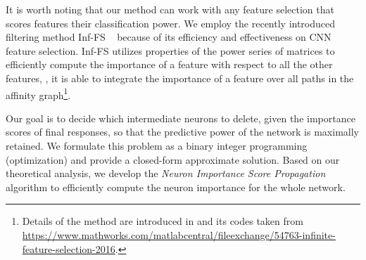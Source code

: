 \documentclass[10pt,twocolumn,letterpaper]{article}
\begin{document}
It is worth noting that our method can work with any feature selection that scores features \wrt their classification power. We employ the recently introduced filtering method Inf-FS ~\cite{Roffo_2015_ICCV} because of its efficiency and effectiveness on CNN feature selection. 
Inf-FS utilizes properties of the power series of matrices to efficiently compute the  importance of a feature with respect to all the other features, \ie, it is able to integrate the importance of a feature over all paths in the affinity graph\footnote{Details of the method are introduced in \cite{Roffo_2015_ICCV} and its codes taken from {\scriptsize\url{https://www.mathworks.com/matlabcentral/fileexchange/54763-infinite-feature-selection-2016}}.}. 

Our goal is to decide which intermediate neurons to delete, given the importance scores of final responses, so that the predictive power of the network is maximally retained. We formulate this problem as a binary integer programming (optimization) and provide a closed-form approximate solution. Based on our theoretical analysis, we develop the \textit{Neuron Importance Score Propagation} algorithm to efficiently compute the neuron importance for the whole network.
\end{document}
